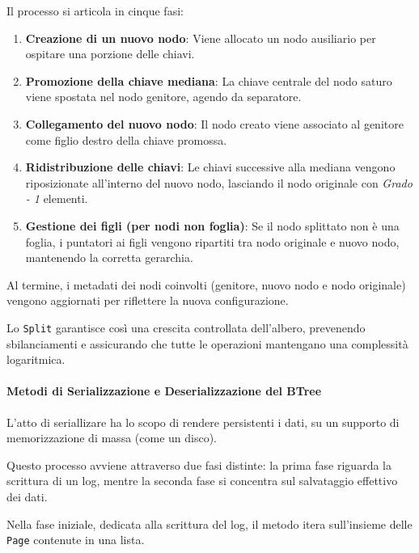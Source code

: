 \documentclass[12pt,a4paper,openright,twoside]{book}
\begin{document}
                    Il processo si articola in cinque fasi:
                    \begin{enumerate}
                        \item \textbf{Creazione di un nuovo nodo}: Viene allocato un nodo ausiliario per ospitare una porzione delle chiavi.
                        \item \textbf{Promozione della chiave mediana}: La chiave centrale del nodo saturo viene spostata nel nodo genitore, agendo da separatore.
                        \item \textbf{Collegamento del nuovo nodo}: Il nodo creato viene associato al genitore come figlio destro della chiave promossa.
                        \item \textbf{Ridistribuzione delle chiavi}: Le chiavi successive alla mediana vengono riposizionate all'interno del nuovo nodo, lasciando il nodo originale con \textit{Grado - 1} elementi.
                        \item \textbf{Gestione dei figli (per nodi non foglia)}: Se il nodo splittato non è una foglia, i puntatori ai figli vengono ripartiti tra nodo originale e nuovo nodo, mantenendo la corretta gerarchia.
                    \end{enumerate}

                    Al termine, i metadati dei nodi coinvolti (genitore, nuovo nodo e nodo originale) vengono aggiornati per riflettere la nuova configurazione.

                    Lo \texttt{Split} garantisce così una crescita controllata dell'albero, prevenendo sbilanciamenti e assicurando che tutte le operazioni mantengano una complessità logaritmica.

                \paragraph{Metodi di Serializzazione e Deserializzazione del BTree}

                    L'atto di seriallizare ha lo scopo di rendere persistenti i dati, su un supporto di memorizzazione di massa (come un disco).

                    Questo processo avviene attraverso due fasi distinte: la prima fase riguarda la scrittura di un log, mentre la seconda fase si concentra sul salvataggio effettivo dei dati.

                    Nella fase iniziale, dedicata alla scrittura del log, il metodo itera sull'insieme delle \texttt{Page} contenute in una lista.
\end{document}
